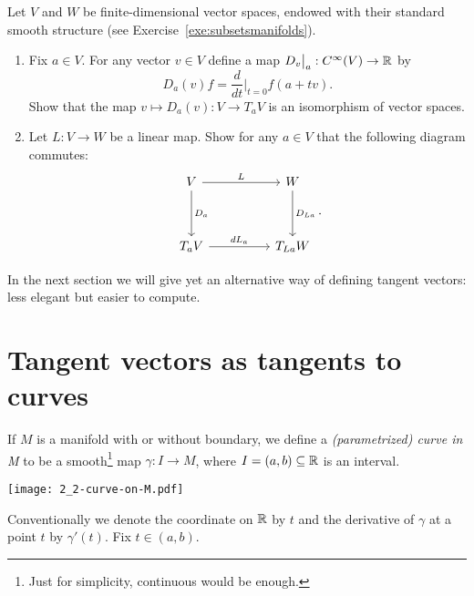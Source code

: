 \begin{exe}
    Let $V$ and $W$ be finite-dimensional vector spaces, endowed with their standard smooth structure (see Exercise~\ref{exe:subsetsmanifolds}).
    \begin{enumerate}
        \item Fix $a\in V$. For any vector $v\in V$ define a map $D_v\big|_a : C^\infty(V) \to \mathbb{R}$ by
        \begin{equation}
            D_a(v) f = \frac{d}{dt}\Big|_{t=0} f(a + tv).
        \end{equation}
        Show that the map $v\mapsto D_a(v) : V \to T_aV$ is an isomorphism of vector spaces.
        \item Let $L:V\to W$ be a linear map. Show for any $a\in V$ that the following diagram commutes:
        \begin{equation}
        \begin{tikzcd}[row sep=huge, column sep=huge]
            V \arrow[r, "L"] \arrow[d, "D_a"]
            & W \arrow[d, "D_{La}"] \\
            T_aV \arrow[r, "dL_a"]
            & T_{La}W
        \end{tikzcd}.
    \end{equation}
    \end{enumerate}
\end{exe}

In the next section we will give yet an alternative way of defining tangent vectors: less elegant but easier to compute.

\section{Tangent vectors as tangents to curves}

\begin{defn}
    If $M$ is a manifold with or without boundary, we define a \emph{(parametrized) curve in M} to be a smooth\footnote{Just for simplicity, continuous would be enough.} map $\gamma : I \to M$, where $I=(a,b)\subseteq\mathbb{R}$ is an interval.
\end{defn}
\begin{marginfigure}
    \texttt{[image: 2\_2-curve-on-M.pdf]}
\end{marginfigure}
Conventionally we denote the coordinate on $\mathbb{R}$ by $t$ and the derivative of $\gamma$ at a point $t$ by $\gamma'(t)$.
Fix $t\in(a,b)$. 

